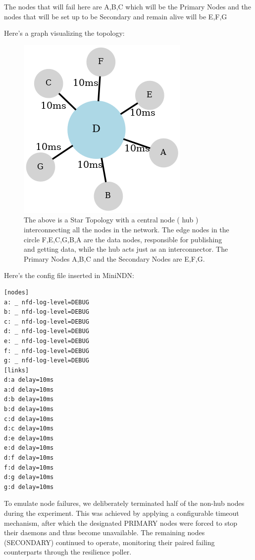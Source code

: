\documentclass{article}
\begin{document}
The nodes that will fail here are A,B,C which will be the Primary Nodes and the nodes that will be set up to be Secondary and remain alive will be E,F,G

\pagebreak

Here's a graph visualizing the topology:

\begin{figure}[H]
    \centering
    \includegraphics[width=0.5\linewidth]{images/star_topology.png}
    \caption{The above is a Star Topology with a central node ( hub ) interconnecting all the nodes in the network. The edge nodes in the circle F,E,C,G,B,A are the data nodes, responsible for publishing and getting data, while the hub acts just as an interconnector. The Primary Nodes A,B,C and the Secondary Nodes are E,F,G.}
    \label{fig:star-topology}
\end{figure}

Here's the config file inserted in MiniNDN:

\begin{lstlisting}[language=minindnconf, caption={The MiniNDN config for creating a star topology},label={lst:minindnconf-star-topology}]
[nodes]
a: _ nfd-log-level=DEBUG
b: _ nfd-log-level=DEBUG
c: _ nfd-log-level=DEBUG
d: _ nfd-log-level=DEBUG
e: _ nfd-log-level=DEBUG
f: _ nfd-log-level=DEBUG
g: _ nfd-log-level=DEBUG
[links]
d:a delay=10ms
a:d delay=10ms
d:b delay=10ms
b:d delay=10ms
c:d delay=10ms
d:c delay=10ms
d:e delay=10ms
e:d delay=10ms
d:f delay=10ms
f:d delay=10ms
d:g delay=10ms
g:d delay=10ms 
\end{lstlisting}

To emulate node failures, we deliberately terminated half of the non-hub nodes during the experiment. This was achieved by applying a configurable timeout mechanism, after which the designated PRIMARY nodes were forced to stop their daemons and thus become unavailable. The remaining nodes (SECONDARY) continued to operate, monitoring their paired failing counterparts through the resilience poller.
\end{document}
